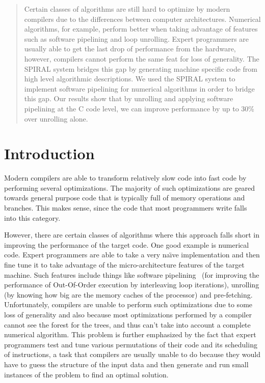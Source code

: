 \documentclass[10pt]{article}
\begin{document}
\maketitle

\begin{abstract}
   Certain classes of algorithms are still hard to optimize by modern compilers
   due to the differences between computer architectures.
   Numerical algorithms, for example, perform better when taking advantage of features
   such as software pipelining and loop unrolling. Expert programmers are usually able to
   get the last drop of performance from the hardware, however, compilers cannot perform the same
   feat for loss of generality. The SPIRAL system bridges this gap by generating machine specific code
   from high level algorithmic descriptions. We used the SPIRAL system to implement software
   pipelining for numerical algorithms in order to bridge this gap. Our results show that
   by unrolling and applying software pipelining at the C code level, we can
   improve performance by up to 30\% over unrolling alone.
\end{abstract}

\section{Introduction}

Modern compilers are able to transform relatively slow code into fast code
by performing several optimizations. The majority of such optimizations
are geared towards general purpose code that is typically full of memory operations and
branches. This makes sense, since the code that most programmers write falls into this category.

However, there are certain classes of algorithms where this approach falls short in improving
the performance of the target code. One good example is numerical code. Expert programmers
are able to take a very na\"\i ve implementation and then fine tune it to take advantage of the
micro-architecture features of the target machine. Such features include things like software
pipelining~\cite{Rau:81} (for improving the performance of Out-Of-Order execution by interleaving loop iterations),
unrolling (by knowing how big are the memory caches of the processor) and pre-fetching.
Unfortunately, compilers are unable to perform such optimizations due
to some loss of generality and also because most optimizations performed by a compiler
cannot see the forest for the trees, and thus can't take into account a complete numerical algorithm.
This problem is further emphasized by the fact that expert programmers test and tune various permutations
of their code and its scheduling of instructions, a task that compilers are usually unable to do because
they would have to guess the structure of the input data and then generate and run small instances of the problem
to find an optimal solution.
\end{document}

